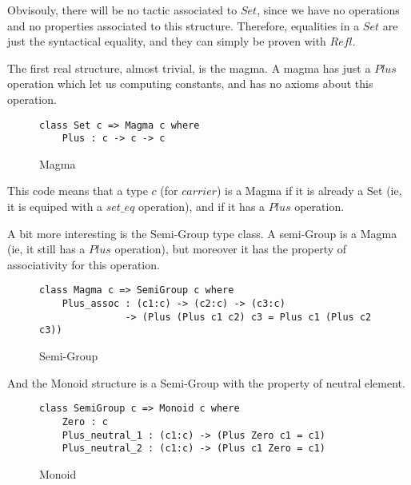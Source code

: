 Obvisouly, there will be no tactic associated to $Set$, since we have no operations and no properties associated to this structure. Therefore, equalities in a $Set$ are just the syntactical equality, and they can simply be proven with $Refl$.

The first real structure, almost trivial, is the magma. A magma has just a $Plus$ operation which let us computing constants, and has no axioms about this operation.

\begin{figure}[H]
\figrule
\begin{center}
\begin{verbatim}
class Set c => Magma c where
    Plus : c -> c -> c
\end{verbatim}
\end{center}
\caption{Magma}
\figrule
\end{figure}

This code means that a type $c$ (for $carrier$) is a Magma if it is already a Set (ie, it is equiped with a $set\_eq$ operation), and if it has a $Plus$ operation.

A bit more interesting is the Semi-Group type class. A semi-Group is a Magma (ie, it still has a $Plus$ operation), but moreover it has the property of associativity for this operation.

\begin{figure}[H]
\figrule
\begin{center}
\begin{verbatim}
class Magma c => SemiGroup c where
    Plus_assoc : (c1:c) -> (c2:c) -> (c3:c) 
               -> (Plus (Plus c1 c2) c3 = Plus c1 (Plus c2 c3))
\end{verbatim}
\end{center}
\caption{Semi-Group}
\figrule
\end{figure}

And the Monoid structure is a Semi-Group with the property of neutral element.

\begin{figure}[H]
\figrule
\begin{center}
\begin{verbatim}
class SemiGroup c => Monoid c where
    Zero : c    
    Plus_neutral_1 : (c1:c) -> (Plus Zero c1 = c1)    
    Plus_neutral_2 : (c1:c) -> (Plus c1 Zero = c1)
\end{verbatim}
\end{center}
\caption{Monoid}
\figrule
\end{figure}

